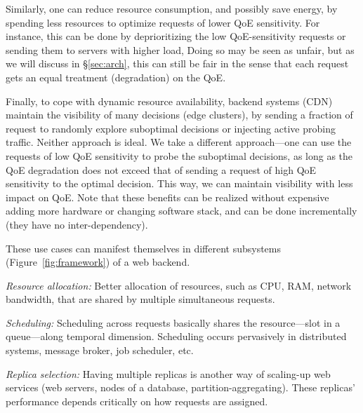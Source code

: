 Similarly, one can reduce resource consumption, and possibly save energy, by spending less resources to optimize requests of lower QoE sensitivity. For instance, this can be done by deprioritizing the low QoE-sensitivity requests or sending them to servers with higher load, 
Doing so may be seen as unfair, but as we will discuss in \S\ref{sec:arch}, this can still be fair in the sense that each request gets an equal treatment (degradation) on the QoE.
    
Finally, to cope with dynamic resource availability, backend systems (\eg CDN) maintain the visibility of many decisions (\eg edge clusters), by sending a fraction of request to randomly explore suboptimal decisions or injecting active probing traffic.
Neither approach is ideal. 
We take a different approach---one can use the requests of low QoE sensitivity to probe the suboptimal decisions, as long as the QoE degradation does not exceed that of sending a request of high QoE sensitivity to the optimal decision.
This way, we can maintain visibility with less impact on QoE.
Note that these benefits can be realized without expensive adding more hardware or changing software stack, and can be done incrementally (they have no inter-dependency).

These use cases can manifest themselves in different subsystems (Figure~\ref{fig:framework}) of a web backend. 
\begin{packeditemize}

\item {\em Resource allocation:} 
Better allocation of resources, such as CPU, RAM, network bandwidth, that are shared by multiple simultaneous requests.

\item {\em Scheduling:}
Scheduling across requests basically shares the resource---slot in a queue---along temporal dimension. Scheduling occurs pervasively in distributed systems, \eg message broker, job scheduler, etc.

\item {\em Replica selection:}
Having multiple replicas is another way of scaling-up web services (\eg web servers, nodes of a database, partition-aggregating). These replicas' performance depends critically on how requests are assigned.

\end{packeditemize}

